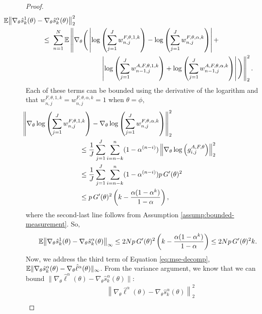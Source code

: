 \begin{proof}
\begin{align}
    & \hspace{-20mm} \nonumber
    \E\big\|\nabla_\theta\hat s_k^1(\theta) - \nabla_\theta\hat s_k^\alpha(\theta)\big\|_2^2
    \\ \nonumber
    &\leq \; \sum_{n=1}^N \E\left\lVert\nabla_\theta \Bigg(\left|\log\left(\sum_{j=1}^Jw_{n,j}^{F,\theta,1,k}\right)- \log\left(\sum_{j=1}^Jw_{n,j}^{F,\theta,\alpha,k}\right)\right|
    + \right.
    \\ & \hspace{30mm} \left.
    \left|\log\left(\sum_{j=1}^Jw_{n-1,j}^{A, F,\theta,1,k}\right) + \log\left(\sum_{j=1}^Jw_{n-1,j}^{A, F,\theta,\alpha,k}\right)\right|\Bigg)\right\rVert_2^2.
\end{align}
Each of these terms can be bounded using the derivative of the logarithm and that $w_{n,j}^{F,\theta,1,k} = w_{n,j}^{F,\theta,\alpha,k} = 1$ when $\theta=\phi$,
\begin{align}
    & \hspace{-30mm}
    \left\lVert\nabla_\theta\log\left(\sum_{j=1}^J w_{n,j}^{F,\theta,1,k}\right)-\nabla_\theta\log\left(\sum_{j=1}^J w_{n,j}^{F,\theta,\alpha,k}\right)\right\rVert_{2}^2
    \\
    &\leq \frac{1}{J}\sum_{j=1}^J \sum_{i=n-k}^{n}(1-\alpha^{(n-i)})\left\lVert\nabla_\theta\log\left(g_{i,j}^{A,F,\theta} \right)\right\rVert_2^2
    \\
    &\leq \frac{1}{J}\sum_{j=1}^J \sum_{i=n-k}^{n}(1-\alpha^{(n-i)})p \, G'(\theta)^2
    \\
    &\leq p \, G'(\theta)^2\left(k-\frac{\alpha(1-\alpha^k)}{1-\alpha}\right),
\end{align}
where the second-last line follows from Assumption \ref{assump:bounded-measurement}.
So, 
\begin{align}
    \mathbb{E}\big\|\nabla_\theta\hat s_k^1(\theta) - \nabla_\theta\hat s_k^\alpha(\theta)\big\|_\infty
    \leq 2Np \, G'(\theta)^2\left(k-\frac{\alpha(1-\alpha^k)}{1-\alpha}\right) 
    \leq 2Np \, G'(\theta)^2k.
\end{align}
Now, we address the third term of Equation \ref{eq:mse-decomp}, $\mathbb{E}\|\nabla_\theta\hat s_k^\alpha(\theta) -  \nabla_\theta\hat\ell^\alpha(\theta)\|_\infty$. From the variance argument, we know that we can bound $\|\nabla_\theta\hat\ell^\alpha(\theta) - \nabla_\theta \hat s_k^\alpha(\theta)\|$:
\begin{align}
    &\left\lVert \nabla_\theta\hat\ell^\alpha(\theta) - \nabla_\theta \hat s_k^\alpha(\theta) \right\rVert_2^2
    \\

\end{align}
\end{proof}
